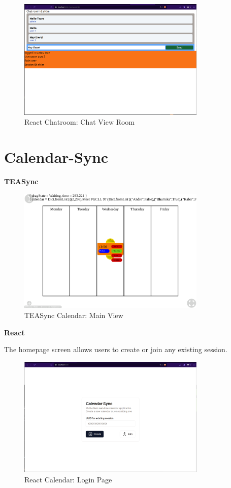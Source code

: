 \begin{figure}[H]
    \centering
    \includegraphics[width=0.8\textwidth]{diagrams/ChatroomMain.png}
    \caption{React Chatroom: Chat View Room}
    \label{fig:enter-label}
\end{figure}

\section{Calendar-Sync}

\textbf{TEASync}

\begin{figure}[H]
    \centering
    \includegraphics[width=0.8\textwidth]{diagrams/TEASyncCalendarApp.png}
    \caption{TEASync Calendar: Main View}
    \label{fig:enter-label}
\end{figure}


\textbf{React}

The homepage screen allows users to create or join any existing session.

\begin{figure}[H]
    \centering
    \includegraphics[width=0.8\textwidth]{diagrams/CalendarAppLogin.png}
    \caption{React Calendar: Login Page}
    \label{fig:enter-label}
\end{figure}

